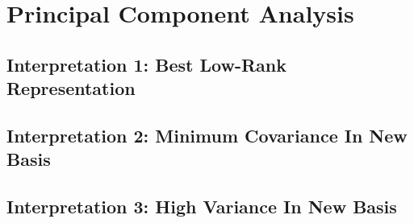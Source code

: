 \section{Principal Component Analysis}

\subsection{Interpretation 1: Best Low-Rank Representation}


\subsection{Interpretation 2: Minimum Covariance In New Basis}


\subsection{Interpretation 3: High Variance In New Basis}
